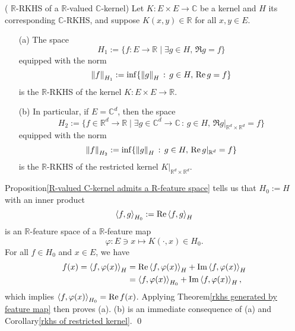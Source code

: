 \documentclass[a4paper,12pt]{article}
\begin{document}
\begin{prp}( \( \mathbb{R} \)-RKHS of a \( \mathbb{R} \)-valued \( \mathbb{C} \)-kernel)
	Let \( K: E \times E \to \mathbb{C} \) be a kernel and \( H \) its corresponding \( \mathbb{C} \)-RKHS, and suppose \( K(x,y) \in \mathbb{R} \) for all \( x, y \in E \).
	\begin{itemize}
		\item[(a)] The space
		      \begin{equation*}
			      H_1:=\{f:E \to \mathbb{R} \mid \exists g \in H,\,\Re g = f\}
		      \end{equation*}
		      equipped with the norm
		      \begin{equation*}
			      \left\| f \right\|_{H_1} := \inf \{\left\| g \right\|_H\,:\, g \in H,\,\operatorname{Re} g = f\}
		      \end{equation*}
		      is the \( \mathbb{R} \)-RKHS of the kernel \( K:E \times E \to \mathbb{R} \).
		      
		\item[(b)] In particular, if \( E =\mathbb{C}^d \), then the space
		      \begin{equation*}
			      H_2:=\{f \in \mathbb{R}^d \to \mathbb{R} \mid \exists g \in \mathbb{C}^d \to \mathbb{C}\,:\, g \in H,\,\Re g|_{\mathbb{R}^d \times \mathbb{R}^d} =f \}
		      \end{equation*}
		      equipped with the norm
		      \begin{equation*}
			      \left\| f \right\|_{H_2} := \inf \{\left\| g \right\|_H \,:\, g \in H,\,\operatorname{Re} g|_{\mathbb{R}^d}=f\}
		      \end{equation*}
		      is the \( \mathbb{R} \)-RKHS of the restricted kernel \( K|_{\mathbb{R}^d \times \mathbb{R}^d} \).
	\end{itemize}
\end{prp}
\begin{prf}
	Proposition\ref{R-valued C-kernel admits a R-feature space} tells us that \( H_0:=H \) with an inner product
	\begin{equation*}
		\left<f, g \right>_{H_0}:= \operatorname{Re} \left<f, g \right>_H
	\end{equation*}
	is an \( \mathbb{R} \)-feature space of a \( \mathbb{R} \)-feature map
	\begin{equation*}
		\varphi:E \ni x \mapsto K(\cdot ,x) \in H_0.
	\end{equation*}
	For all \( f \in H_0 \) and \( x \in E \), we have
	\begin{equation*}
		\begin{aligned}
			f(x) = \left<f, \varphi(x) \right>_H
			 & = \operatorname{Re} \left<f, \varphi(x) \right>_H + \operatorname{Im} \left<f, \varphi(x) \right>_H  \\
			 & = \left<f, \varphi(x) \right>_{H_0} + \operatorname{Im} \left<f, \varphi(x) \right>_H,
		\end{aligned}
	\end{equation*}
	which implies \( \left<f, \varphi(x) \right>_{H_0}= \operatorname{Re} f(x) \). Applying Theorem\ref{rkhs generated by feature map} then proves (a). (b) is an immediate consequence of (a) and Corollary\ref{rkhs of restricted kernel}.
	\qed\end{prf}
\end{document}
